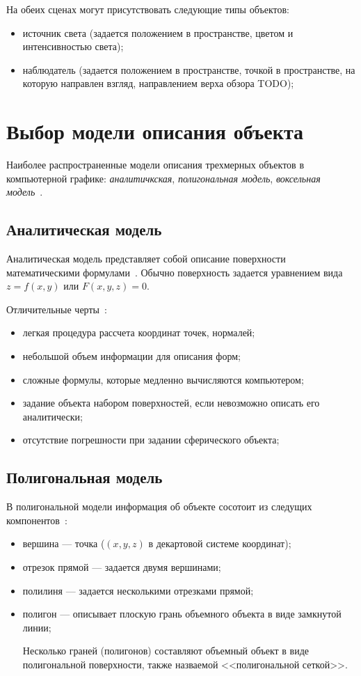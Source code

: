 На обеих сценах могут присутствовать следующие типы объектов:
\begin{itemize}
	\item источник света (задается положением в пространстве, цветом и интенсивностью света);
	\item наблюдатель (задается положением в пространстве, точкой в пространстве, на которую направлен взгляд, направлением верха обзора TODO);
\end{itemize}

 \section{Выбор модели описания объекта}
Наиболее распространенные модели описания трехмерных объектов в компьютерной графике: \textit{аналитичкская}, \textit{полигональная модель}, \textit{воксельная модель}~\cite{porev}.

\subsection{Аналитическая модель}
Аналитическая модель представляет собой описание поверхности математическими формулами~\cite{porev}. Обычно поверхность задается уравнением вида $z=f(x,y)$ или $F(x,y,z)=0$.

Отличительные черты~\cite{porev}:
\begin{itemize}
	\item легкая процедура рассчета координат точек, нормалей;
	\item небольшой объем информации для описания форм;
	\item сложные формулы, которые медленно вычисляются компьютером;
	
	\item задание объекта набором поверхностей, если невозможно описать его аналитически;
	\item отсутствие погрешности при задании сферического объекта; 
\end{itemize}

\subsection{Полигональная модель}
В полигональной модели информация об объекте сосотоит из следущих компонентов~\cite{porev}:
\begin{itemize}
	\item вершина --- точка ($(x, y, z)$ в декартовой системе координат);
	\item отрезок прямой --- задается двумя вершинами;
	\item полилиня --- задается несколькими отрезками прямой;
	\item полигон --- описывает плоскую грань объемного объекта в виде замкнутой линии;
	
	Несколько граней (полигонов) составляют объемный объект в виде полигональной поверхности, также назваемой <<полигональной сеткой>>.
\end{itemize}

